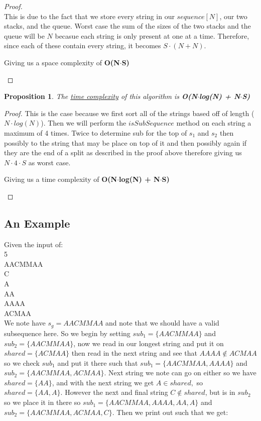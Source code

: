 \documentclass[12pt]{article}
\newtheorem{proposition}[theorem]{Proposition}
\begin{document}
\begin{proof}
~ \\ \indent This is due to the fact that we store every string in our $sequence[N]$, our two stacks,
and the queue. Worst case the sum of the sizes of the two stacks and the queue will be $N$ becasue each string
is only present at one at a time. Therefore, since each of these contain every string, it becomes $S\cdot (N + N)$.
\begin{center}
    Giving us a space complexity of \textbf{O(N$\cdot$S)}
\end{center}
\end{proof}

\begin{proposition}
\label{numq}
The \underline{time complexity} of this algorithm is \textbf{O(N$\cdot$log(N) + N$\cdot$S)}
\end{proposition}

\begin{proof}
This is the case because we first sort all of the strings based off of length ($N\cdot log(N)$). Then we will
perform the $isSubSequence$ method on each string a maximum of 4 times. Twice to determine sub for the top of
$s_1$ and $s_2$ then possibly to the string that may be place on top of it and then possibly again if they are
the end of a split as described in the proof above therefore giving us $N\cdot4\cdot S$ as worst case.

\begin{center}
    Giving us a time complexity of \textbf{O(N$\cdot$log(N) + N$\cdot$S)}
\end{center}
\end{proof}

\newpage
\subsection{An Example}
Given the input of:  \\
5           \\
AACMMAA     \\
C           \\
A           \\
AA          \\
AAAA        \\
ACMAA       \\

We note have $s_g = AACMMAA$ and note that we should have a valid subsequence here. So we begin by setting
$sub_1 = \{AACMMAA\}$ and $sub_2 = \{AACMMAA\}$, now we read in our longest string and put it on
$shared = \{ACMAA\}$ then read in the next string and see that $AAAA \notin ACMAA$ so we check $sub_1$ and
put it there such that $sub_1 = \{AACMMAA, AAAA\}$ and $sub_2 = \{AACMMAA, ACMAA\}$. Next string we note
can go on either so we have $shared = \{AA\}$, and with the next string we get $A \in shared,
$ so $shared = \{AA, A\}$. However the next and final string $C \notin shared$, but is in $sub_2$ so we
place it in there so $sub_1 = \{AACMMAA, AAAA, AA, A\}$ and $sub_2 = \{AACMMAA, ACMAA, C\}$. Then we print
out such that we get: \\
\end{document}
